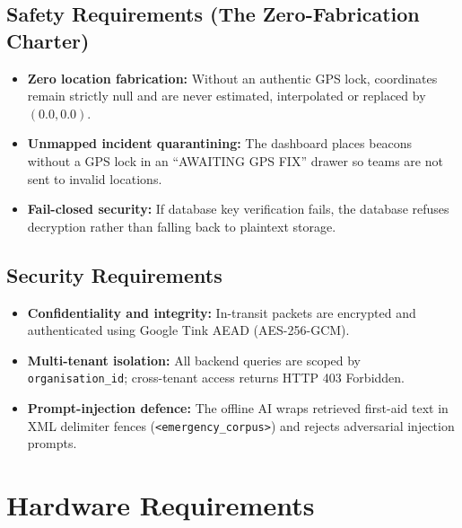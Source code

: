 \documentclass[12pt,a4paper]{report}
\begin{document}
\subsection{Safety Requirements (The Zero-Fabrication Charter)}
\begin{itemize}
    \item \textbf{Zero location fabrication:} Without an authentic GPS lock, coordinates remain strictly null and are never estimated, interpolated or replaced by $(0.0, 0.0)$.
    \item \textbf{Unmapped incident quarantining:} The dashboard places beacons without a GPS lock in an ``AWAITING GPS FIX'' drawer so teams are not sent to invalid locations.
    \item \textbf{Fail-closed security:} If database key verification fails, the database refuses decryption rather than falling back to plaintext storage.
\end{itemize}

\subsection{Security Requirements}
\begin{itemize}
    \item \textbf{Confidentiality and integrity:} In-transit packets are encrypted and authenticated using Google Tink AEAD (AES-256-GCM).
    \item \textbf{Multi-tenant isolation:} All backend queries are scoped by \texttt{organisation\_id}; cross-tenant access returns HTTP 403 Forbidden.
    \item \textbf{Prompt-injection defence:} The offline AI wraps retrieved first-aid text in XML delimiter fences (\texttt{<emergency\_corpus>}) and rejects adversarial injection prompts.
\end{itemize}

\section{Hardware Requirements}
\end{document}
